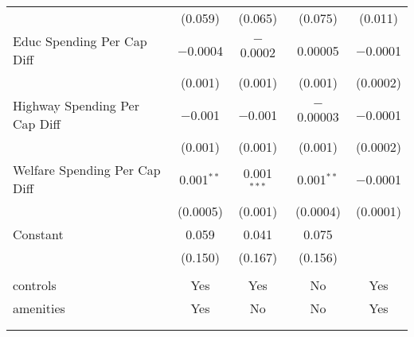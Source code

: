 \begin{table}[!htbp]
\begin{tabular}{@{\extracolsep{5pt}}lcccc}
  & (0.059) & (0.065) & (0.075) & (0.011) \\ 
  Educ Spending Per Cap Diff & $-$0.0004 & $-$0.0002 & 0.00005 & $-$0.0001 \\ 
  & (0.001) & (0.001) & (0.001) & (0.0002) \\ 
  Highway Spending Per Cap Diff & $-$0.001 & $-$0.001 & $-$0.00003 & $-$0.0001 \\ 
  & (0.001) & (0.001) & (0.001) & (0.0002) \\ 
  Welfare Spending Per Cap Diff & 0.001$^{**}$ & 0.001$^{***}$ & 0.001$^{**}$ & $-$0.0001 \\ 
  & (0.0005) & (0.001) & (0.0004) & (0.0001) \\ 
  Constant & 0.059 & 0.041 & 0.075 &  \\ 
  & (0.150) & (0.167) & (0.156) &  \\ 
 \hline \\[-1.8ex] 
controls & Yes & Yes & No & Yes \\ 
amenities & Yes & No & No & Yes \\ 
\hline \\[-1.8ex] 
\hline 
\hline \\[-1.8ex] 
\end{tabular} 
\end{table} 
